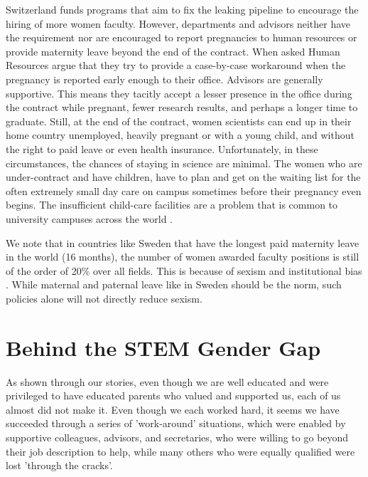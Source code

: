 \documentclass[utf8]{frontiersSCNS} %
\begin{document}
Switzerland funds programs that aim to fix the leaking pipeline to encourage the hiring of more women faculty. However, departments and advisors neither have the requirement nor are encouraged to report pregnancies to human resources or provide maternity leave beyond the end of the contract. When asked Human Resources argue that they try to provide a case-by-case workaround when the pregnancy is reported early enough to their office. Advisors are generally supportive. This means they tacitly accept a lesser presence in the office during the contract while pregnant, fewer research results, and perhaps a longer time to graduate. Still, at the end of the contract, women scientists can end up in their home country unemployed, heavily pregnant or with a young child, and without the right to paid leave or even health insurance. Unfortunately, in these circumstances, the chances of staying in science are minimal. The women who are under-contract and have children, have to plan and get on the waiting list for the often extremely small day care on campus sometimes before their pregnancy even begins. The insufficient child-care facilities are a problem that is common to university campuses across the world \citep{2018Report}.

We note that in countries like Sweden that have the longest paid maternity leave in the world (16 months), the number of women awarded faculty positions is still of the order of 20\% over all fields. This is because of sexism and institutional bias \citep{Sweden}.  While maternal and paternal leave like in Sweden should be the norm, such policies alone will not directly reduce sexism. 

\section{Behind the STEM Gender Gap}
\label{causes}
 As shown through our stories, even though we are well educated and were privileged to have educated parents who valued and supported us, each of us almost did not make it. Even though we each worked hard, it seems we have succeeded through a series of 'work-around' situations, which were enabled by supportive colleagues, advisors, and secretaries, who were willing to go beyond their job description to help, while many others who were equally qualified were lost 'through the cracks'. 
 
\end{document}
